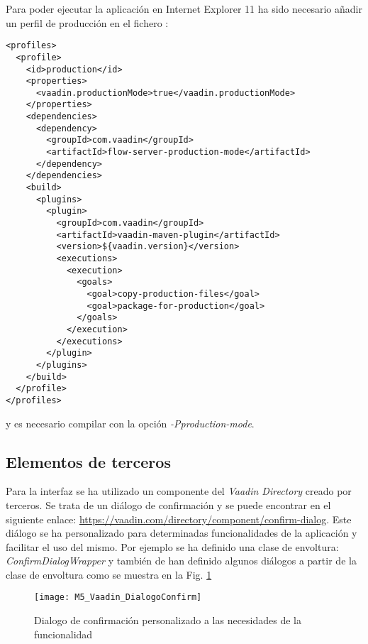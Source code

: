 Para poder ejecutar la aplicación en Internet Explorer 11 ha sido necesario añadir un perfil de producción en el fichero :\\
\begin{minipage}{\linewidth}
{\tiny \begin{lstlisting}
<profiles>
  <profile>
    <id>production</id>
    <properties>
      <vaadin.productionMode>true</vaadin.productionMode>
    </properties>
    <dependencies>
      <dependency>
        <groupId>com.vaadin</groupId>
        <artifactId>flow-server-production-mode</artifactId>
      </dependency>
    </dependencies>
    <build>
      <plugins>
        <plugin>
          <groupId>com.vaadin</groupId>
          <artifactId>vaadin-maven-plugin</artifactId>
          <version>${vaadin.version}</version>
          <executions>
            <execution>
              <goals>
                <goal>copy-production-files</goal>
                <goal>package-for-production</goal>
              </goals>
            </execution>
          </executions>
        </plugin>
      </plugins>
    </build>
  </profile>
</profiles>
\end{lstlisting}}
\end{minipage}
y es necesario compilar con la opción \textit{-Pproduction-mode}.

\subsection{Elementos de terceros}

Para la interfaz se ha utilizado un componente del \textit{Vaadin Directory} creado por terceros. Se trata de un diálogo de confirmación y se puede encontrar en el siguiente enlace: \url{https://vaadin.com/directory/component/confirm-dialog}. Este diálogo se ha personalizado para determinadas funcionalidades de la aplicación y facilitar el uso del mismo. Por ejemplo se ha definido una clase de envoltura: \textit{ConfirmDialogWrapper} y también de han definido algunos diálogos a partir de la clase de envoltura como se muestra en la Fig. \ref{fig:M5_Vaadin_DialogoConfirm}

\begin{figure}[!h]
	\centering
	\texttt{[image: M5\_Vaadin\_DialogoConfirm]}
	\caption{Dialogo de confirmación personalizado a las necesidades de la funcionalidad}\label{fig:M5_Vaadin_DialogoConfirm}
\end{figure}
